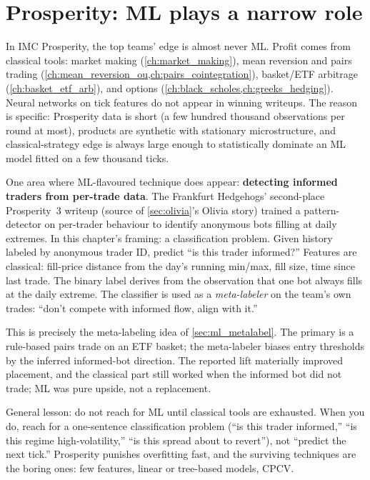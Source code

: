 \section{Prosperity: ML plays a narrow role}
\label{sec:ml_prosperity}

\begin{prosperitybox}
In IMC Prosperity, the top teams' edge is almost never ML. Profit
comes from classical tools: market making
(\cref{ch:market_making}), mean reversion and pairs trading
(\cref{ch:mean_reversion_ou,ch:pairs_cointegration}), basket/ETF
arbitrage (\cref{ch:basket_etf_arb}), and options
(\cref{ch:black_scholes,ch:greeks_hedging}). Neural networks on
tick features do not appear in winning writeups. The reason is
specific: Prosperity data is short (a few hundred thousand
observations per round at most), products are synthetic with
stationary microstructure, and classical-strategy edge is always
large enough to statistically dominate an ML model fitted on a
few thousand ticks.

One area where ML-flavoured technique does appear:
\textbf{detecting informed traders from per-trade data}. The
Frankfurt Hedgehogs' second-place Prosperity~3 writeup (source of
\cref{sec:olivia}'s Olivia story) trained a pattern-detector on
per-trader behaviour to identify anonymous bots filling at daily
extremes. In this chapter's framing: a classification problem.
Given history labeled by anonymous trader ID, predict ``is this
trader informed?'' Features are classical: fill-price distance
from the day's running min/max, fill size, time since last trade.
The binary label derives from the observation that one bot always
fills at the daily extreme. The classifier is used as a
\emph{meta-labeler} on the team's own trades: ``don't compete
with informed flow, align with it.''

This is precisely the meta-labeling idea of
\cref{sec:ml_metalabel}. The primary is a rule-based pairs trade
on an ETF basket; the meta-labeler biases entry thresholds by the
inferred informed-bot direction. The reported lift materially
improved placement, and the classical part still worked when the
informed bot did not trade; ML was pure upside, not a
replacement.

General lesson: do not reach for ML until classical tools are
exhausted. When you do, reach for a one-sentence classification
problem (``is this trader informed,'' ``is this regime
high-volatility,'' ``is this spread about to revert''), not
``predict the next tick.'' Prosperity punishes overfitting fast,
and the surviving techniques are the boring ones: few features,
linear or tree-based models, CPCV.
\end{prosperitybox}

